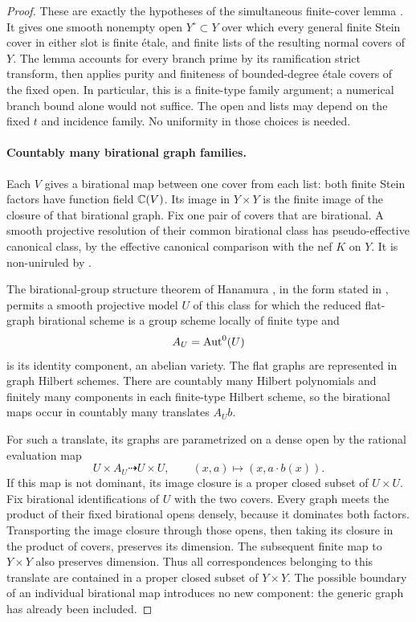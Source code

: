 \begin{proof}
These are exactly the hypotheses of the simultaneous finite-cover
lemma \cite[Lemma~7.5]{OpenAIAbundance2026}. It gives one smooth
nonempty open \(Y^\circ\subset Y\) over which every general finite
Stein cover in either slot is finite \'etale, and finite lists of
the resulting normal covers of \(Y\). The lemma accounts for every
branch prime by its ramification strict transform, then applies
purity and finiteness of bounded-degree \'etale covers of the fixed
open. In particular, this is a finite-type family argument; a
numerical branch bound alone would not suffice. The open and lists
may depend on the fixed \(t\) and incidence family. No uniformity
in those choices is needed.

\paragraph{Countably many birational graph families.}
Each \(V\) gives a birational map between one cover from each list:
both finite Stein factors have function field \(\mathbb C(V)\). Its
image in \(Y\times Y\) is the finite image of the closure of that
birational graph. Fix one pair of covers that are birational.
A smooth projective resolution of their common birational class
has pseudo-effective canonical class, by the effective canonical
comparison with the nef \(K\) on \(Y\). It is non-uniruled by
\cite{BDPP2013}.

The birational-group structure theorem of Hanamura
\cite{Hanamura1988}, in the form stated in
\cite[Proposition 3.7 and Theorem 3.8]{Blanc2017}, permits a smooth
projective model \(U\) of this class for which the reduced
flat-graph birational scheme is a group scheme locally of finite
type and
\[
 A_U=\operatorname{Aut}^0(U)
\]
is its identity component, an abelian variety. The flat graphs are
represented in graph Hilbert schemes. There are countably many
Hilbert polynomials and finitely many components in each
finite-type Hilbert scheme, so the birational maps occur in
countably many translates \(A_U b\).

For such a translate, its graphs are parametrized on a dense open
by the rational evaluation map
\begin{equation}\label{eq:abelian-graph-evaluation}
 U\times A_U\dashrightarrow U\times U,\qquad
 (x,a)\longmapsto(x,a\cdot b(x)).
\end{equation}
If this map is not dominant, its image closure is a proper closed
subset of \(U\times U\). Fix birational identifications of \(U\)
with the two covers. Every graph meets the product of their fixed
birational opens densely, because it dominates both factors.
Transporting the image closure through those opens, then taking
its closure in the product of covers, preserves its dimension.
The subsequent finite map to \(Y\times Y\) also preserves
dimension. Thus all correspondences belonging to this translate
are contained in a proper closed subset of \(Y\times Y\).
The possible boundary of an individual birational map introduces
no new component: the generic graph has already been included.


\end{proof}
